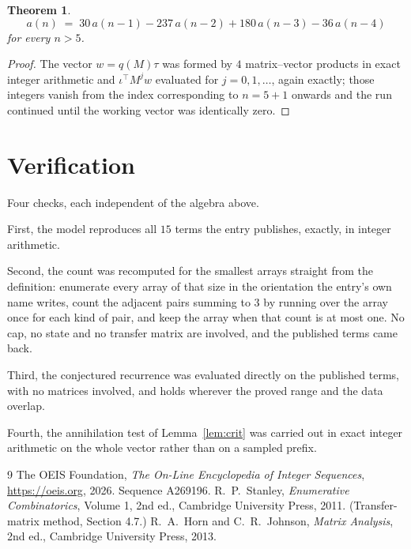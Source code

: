 \documentclass[11pt,a4paper]{article}
\theoremstyle{plain}
\newtheorem{theorem}{Theorem}
\theoremstyle{definition}
\begin{document}
\begin{theorem}
\[
a(n)\;=\;30\,a(n-1) - 237\,a(n-2) + 180\,a(n-3) - 36\,a(n-4)
\]
for every $n>5$.
\end{theorem}

\begin{proof}
The vector $w=q(M)\tau$ was formed by $4$ matrix--vector products in exact integer
arithmetic and $\iota^{\!\top}M^{j}w$ evaluated for $j=0,1,\dots$, again exactly; those
integers vanish from the index corresponding to $n=5+1$ onwards and the run continued
until the working vector was identically zero.
\end{proof}

\section{Verification}

Four checks, each independent of the algebra above.

First, the model reproduces all $15$ terms the entry publishes, exactly, in integer
arithmetic.

Second, the count was recomputed for the smallest arrays straight from the definition:
enumerate every array of that size in the orientation the entry's own name writes, count the
adjacent pairs summing to $3$ by running over the array once for each kind of pair, and keep
the array when that count is at most one. No cap, no state and no transfer matrix are involved, and
the published terms came back.

Third, the conjectured recurrence was evaluated directly on the published terms, with no
matrices involved, and holds wherever the proved range and the data overlap.

Fourth, the annihilation test of Lemma~\ref{lem:crit} was carried out in exact integer
arithmetic on the whole vector rather than on a sampled prefix.

\begin{thebibliography}{9}
 The OEIS Foundation, \emph{The On-Line Encyclopedia of Integer
Sequences}, \url{https://oeis.org}, 2026. Sequence A269196.
 R.~P.~Stanley, \emph{Enumerative Combinatorics}, Volume 1, 2nd ed.,
Cambridge University Press, 2011. (Transfer-matrix method, Section 4.7.)
 R.~A.~Horn and C.~R.~Johnson, \emph{Matrix Analysis}, 2nd ed., Cambridge
University Press, 2013.
\end{thebibliography}
\end{document}
